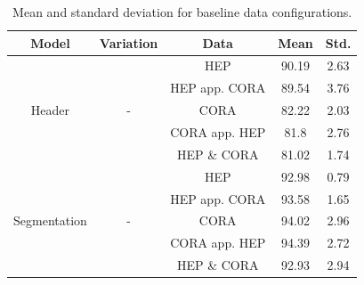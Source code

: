 
\begin{table}[t]
\begin{center}
\begin{tabular}{|c|c|c|c|c|}
\hline
Model & Variation & Data & Mean & Std.\\
\hline
\multirow{5}{*}{Header} & \multirow{5}{*}{-} & HEP & 90.19 & 2.63\\\cline{3-5}
& & HEP app. CORA & 89.54 & 3.76\\\cline{3-5}
& & CORA & 82.22 & 2.03\\\cline{3-5}
& & CORA app. HEP & 81.8 & 2.76\\\cline{3-5}
& & HEP \& CORA & 81.02 & 1.74 \\ \hline
\multirow{5}{*}{Segmentation} & \multirow{5}{*}{-} & HEP & 92.98 & 0.79\\\cline{3-5}
& & HEP app. CORA & 93.58 & 1.65\\\cline{3-5}
& & CORA & 94.02 & 2.96\\\cline{3-5}
& & CORA app. HEP & 94.39 & 2.72\\\cline{3-5}
& & HEP \& CORA & 92.93 & 2.94\\\cline{3-5}
\hline
\end{tabular}
\caption{Mean and standard deviation for baseline data configurations.}
\label{table:baselineresults}
\end{center}
\end{table}

